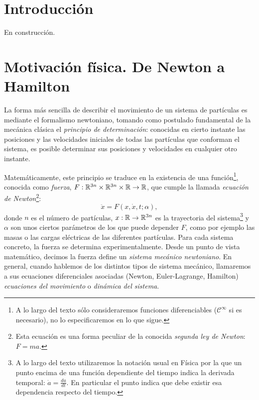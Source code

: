 \section*{Introducción}
En construcción.
\section{Motivación física. De Newton a Hamilton}
La forma más sencilla de describir el movimiento de un sistema de partículas es mediante el formalismo newtoniano, tomando como postulado fundamental de la mecánica clásica el \emph{principio de determinación}: conocidas en cierto instante las posiciones y las velocidades iniciales de todas las partículas que conforman el sistema, es posible determinar sus posiciones y velocidades en cualquier otro instante.

Matemáticamente, este principio se traduce en la existencia de una función\footnote{A lo largo del texto sólo consideraremos funciones diferenciables ($\mathcal{C}^{\infty}$ si es necesario), no lo especificaremos en lo que sigue.}, conocida como \emph{fuerza}, $F: \mathbb{R}^{3n} \times \mathbb{R}^{3n} \times \mathbb{R} \rightarrow \mathbb{R}$, que cumple la llamada \emph{ecuación de Newton}\footnote{Esta ecuación es una forma peculiar de la conocida \emph{segunda ley de Newton}: $F=ma$.}:
\begin{equation*}
  \ddot{x} = F(x,\dot{x},t;\alpha),
\end{equation*}
donde $n$ es el número de partículas, $x:\mathbb{R} \rightarrow \mathbb{R}^{3n}$ es la trayectoria del sistema\footnote{A lo largo del texto utilizaremos la notación usual en Física por la que un punto encima de una función dependiente del tiempo indica la derivada temporal: $\dot{a}=\frac{da}{dt}$. En particular el punto indica que debe existir esa dependencia respecto del tiempo.} y $\alpha$ son unos ciertos parámetros de los que puede depender $F$, como por ejemplo las masas o las cargas eléctricas de las diferentes partículas. Para cada sistema concreto, la fuerza se determina experimentalmente. Desde un punto de vista matemático, decimos la fuerza define un \emph{sistema mecánico newtoniano}. En general, cuando hablemos de los distintos tipos de sistema mecánico, llamaremos a sus ecuaciones diferenciales asociadas (Newton, Euler-Lagrange, Hamilton) \emph{ecuaciones del movimiento} o \emph{dinámica del sistema}.

